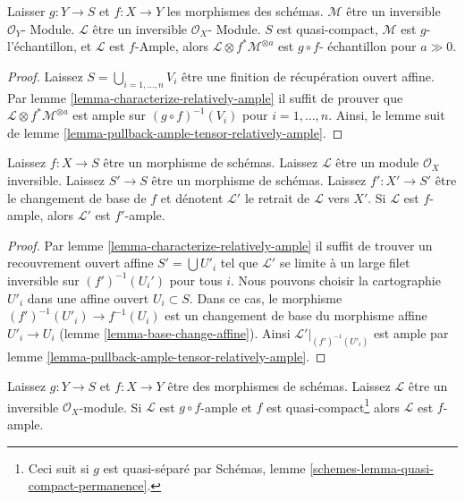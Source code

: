 \begin{lemma}

\label{lemma-ample-composition}

Laisser $g : Y \to S$ et $f : X \to Y$ les morphismes des schémas. $\mathcal{M}$ être un inversible $\mathcal{O}_Y$- Module. $\mathcal{L}$ être un inversible $\mathcal{O}_X$- Module. $S$ est quasi-compact, $\mathcal{M}$ est $g$-l'échantillon, et
$\mathcal{L}$ est $f$-Ample, alors
$\mathcal{L} \otimes f^*\mathcal{M}^{\otimes a}$
est $g \circ f$- échantillon pour $a \gg 0$.

\end{lemma}

\begin{proof}
Laissez $S = \bigcup_{i = 1, \ldots, n} V_i$ être une finition de récupération ouvert affine. Par lemme \ref{lemma-characterize-relatively-ample} il suffit de prouver que $\mathcal{L} \otimes f^*\mathcal{M}^{\otimes a}$ est ample sur $(g \circ f)^{-1}(V_i)$ pour $i = 1, \ldots, n$. Ainsi, le lemme suit de lemme \ref{lemma-pullback-ample-tensor-relatively-ample}.
\end{proof}

\begin{lemma}

\label{lemma-ample-base-change}
Laissez $f : X \to S$ être un morphisme de schémas. Laissez $\mathcal{L}$ être un module $\mathcal{O}_X$ inversible. Laissez $S' \to S$ être un morphisme de schémas. Laissez $f' : X' \to S'$ être le changement de base de $f$ et dénotent $\mathcal{L}'$ le retrait de $\mathcal{L}$ vers $X'$. Si $\mathcal{L}$ est $f$-ample, alors $\mathcal{L}'$ est $f'$-ample.
\end{lemma}

\begin{proof}
Par lemme \ref{lemma-characterize-relatively-ample} il suffit de trouver un recouvrement ouvert affine $S' = \bigcup U'_i$ tel que $\mathcal{L}'$ se limite à un large filet inversible sur $(f')^{-1}(U_i')$ pour tous $i$. Nous pouvons choisir la cartographie $U'_i$ dans une affine ouvert $U_i \subset S$. Dans ce cas, le morphisme $(f')^{-1}(U'_i) \to f^{-1}(U_i)$ est un changement de base du morphisme affine $U'_i \to U_i$ (lemme \ref{lemma-base-change-affine}). Ainsi $\mathcal{L}'|_{(f')^{-1}(U'_i)}$ est ample par lemme \ref{lemma-pullback-ample-tensor-relatively-ample}.
\end{proof}

\begin{lemma}

\label{lemma-ample-permanence}
Laissez $g : Y \to S$ et $f : X \to Y$ être des morphismes de schémas. Laissez $\mathcal{L}$ être un inversible $\mathcal{O}_X$-module. Si $\mathcal{L}$ est $g \circ f$-ample et $f$ est quasi-compact\footnote{Ceci suit si $g$ est quasi-séparé par Schémas, lemme \ref{schemes-lemma-quasi-compact-permanence}.} alors $\mathcal{L}$ est $f$-ample.
\end{lemma}

